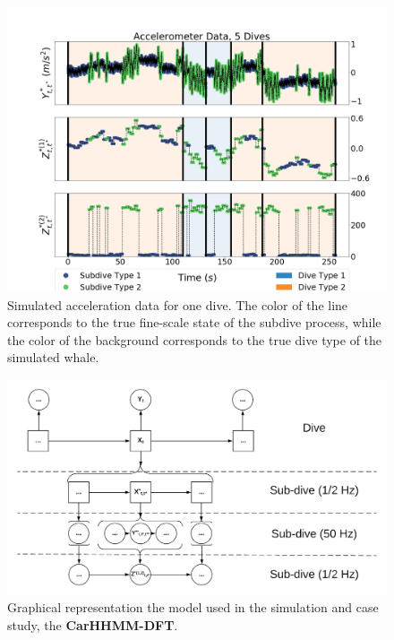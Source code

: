 
\begin{figure}[ht]
	\centering
	\includegraphics[width=5in]{../Plots/sim_data.png}
	\caption{Simulated acceleration data for one dive. The color of the line corresponds to the true fine-scale state of the subdive process, while the color of the background corresponds to the true dive type of the simulated whale.}
	\label{fig:sim_data}
\end{figure}

\begin{figure}[ht]
	\centering
	\includegraphics[width=5in]{../Plots/CarHHMM-DFT.png}
	\caption{Graphical representation the model used in the simulation and case study, the \textbf{CarHHMM-DFT}.}
	\label{fig:CarHHMM-DFT}
\end{figure}

